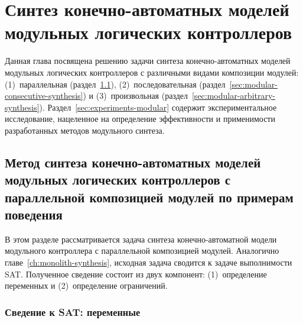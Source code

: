 \chapter{Синтез конечно-автоматных моделей модульных логических контроллеров}%
\label{ch:modular-synthesis}

Данная глава посвящена решению задачи синтеза конечно-автоматных моделей модульных логических контроллеров с различными видами композиции модулей: (1)~параллельная (раздел~\ref{sec:modular-parallel-synthesis}), (2)~последовательная (раздел~\ref{sec:modular-consecutive-synthesis}) и (3)~произвольная (раздел~\ref{sec:modular-arbitrary-synthesis}).
Раздел~\ref{sec:experiments-modular} содержит экспериментальное исследование, нацеленное на определение эффективности и применимости разработанных методов модульного синтеза.


% 

% 
\section{Метод синтеза конечно-автоматных моделей модульных логических контроллеров с параллельной композицией модулей по примерам поведения}%
\label{sec:modular-parallel-synthesis}

В этом разделе рассматривается задача синтеза конечно-автоматной модели модульного контроллера с параллельной композицией модулей.
Аналогично главе~\ref{ch:monolith-synthesis}, исходная задача сводится к задаче выполнимости SAT.
Полученное сведение состоит из двух компонент: (1)~определение переменных и (2)~определение ограничений.


\subsection{Сведение к SAT: переменные}%
\label{sub:modular-parallel-variables}

